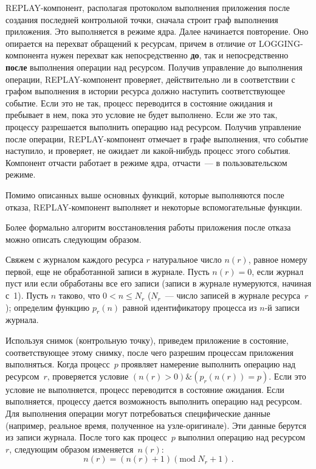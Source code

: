 \begin{multicols}{2}
REPLAY-компонент, располагая протоколом выполнения приложения после
создания последней контрольной точки, сначала строит граф выполнения
приложения. Это выполняется в режиме ядра. Далее начинается повторение.
Оно опирается на перехват обращений к ресурсам, причем в отличие от
LOGGING-компонента нужен пере\-хват как непосредственно \textbf{до}, так и
не\-по\-средст\-вен\-но \textbf{после}  выполнения операции над ресур\-сом. Получив
управление до выполнения операции, REPLAY-компонент проверяет,
действительно ли в соответствии с графом выполнения в истории ресурса
должно наступить соответствующее
 событие. Если это не так, процесс
переводится в со\-сто\-яние ожидания и пребывает в нем, пока это условие не
будет выполнено. Если же это так, процессу разрешается выполнить операцию
над ресурсом. Получив управление после операции, REPLAY-компонент
отмечает в графе выполнения, что событие наступило, и проверяет, не ожидает
ли какой-нибудь процесс этого события. Компонент отчасти работает в режиме
ядра, отчасти~--- в пользовательском режиме.

Помимо описанных выше основных функций, которые выполняются  после
отказа, REPLAY-компонент выполняет и некоторые вспомогательные функции.

Более формально алгоритм восстановления работы приложения после отказа
можно описать следующим образом.

Свяжем с журналом каждого ресурса $r$ натуральное число $n(r)$, равное номеру 
первой, еще не обработанной записи в журнале. Пусть $n(r) =0$, если журнал пуст 
или если обработаны все его записи (записи в журнале нумеруются, начиная с~1). 
Пусть $n$ таково, что $0 < n \leq N_r$ ($N_r$~--- число записей в журнале 
ресурса~$r$); определим функцию $p_r(n)$ равной идентификатору процесса из 
$n$-й записи жур\-нала. {

}

Используя снимок (контрольную точку), приведем приложение в состояние,
соответствующее этому снимку, после чего разрешим процессам приложения
выполняться. Когда процесс~$p$ проявляет намерение выполнить операцию над 
ресурсом~$r$, проверяется условие $(n(r)>0) \& (p_r(n(r)) =p)$. Если это 
условие не выполняется, процесс переводится в состояние ожидания. Если 
выполняется, процессу дается возможность выполнить операцию над ресурсом. Для 
выполнения операции могут потребоваться специфические данные (например, 
реальное время, полученное на узле-оригинале). Эти данные берутся из записи 
журнала. После того как процесс~$p$ выполнил операцию над ресурсом~$r$, 
следующим образом изменяется~$n(r)$:
$$
n(r) = (n(r) + 1)(\mathrm{mod}\;N_r  + 1)\,.
$$


\end{multicols}
